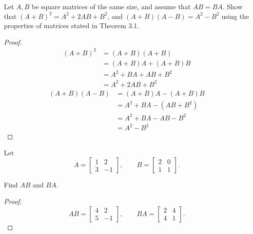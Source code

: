 \begin{exercise}
    Let $A, B$ be square matrices of the same size, and assume that $AB = BA$. Show that ${(A + B)}^{2} = A^{2} + 2AB + B^{2}$, and $(A + B)(A - B) = A^{2} - B^{2}$ using the properties of matrices stated in Theorem 3.1.
\end{exercise}

\begin{proof}
    \begin{align*}
        {(A + B)}^{2} & = (A + B)(A + B)          \\
                      & = (A + B)A + (A + B)B     \\
                      & = A^{2} + BA + AB + B^{2} \\
                      & = A^{2} + 2AB + B^{2}
    \end{align*}
    \begin{align*}
        (A + B)(A - B) & = (A + B)A - (A + B)B       \\
                       & = A^{2} + BA - (AB + B^{2}) \\
                       & = A^{2} + BA - AB - B^{2}   \\
                       & = A^{2} - B^{2}
    \end{align*}
\end{proof}

\begin{exercise}
    Let
    \[
        A = \begin{bmatrix}
            1 & 2  \\
            3 & -1
        \end{bmatrix},\qquad
        B = \begin{bmatrix}
            2 & 0 \\
            1 & 1
        \end{bmatrix}.
    \]

    Find $AB$ and $BA$.
\end{exercise}

\begin{proof}
    \[
        AB = \begin{bmatrix}
            4 & 2  \\
            5 & -1
        \end{bmatrix},\qquad
        BA = \begin{bmatrix}
            2 & 4 \\
            4 & 1
        \end{bmatrix}.
    \]
\end{proof}

